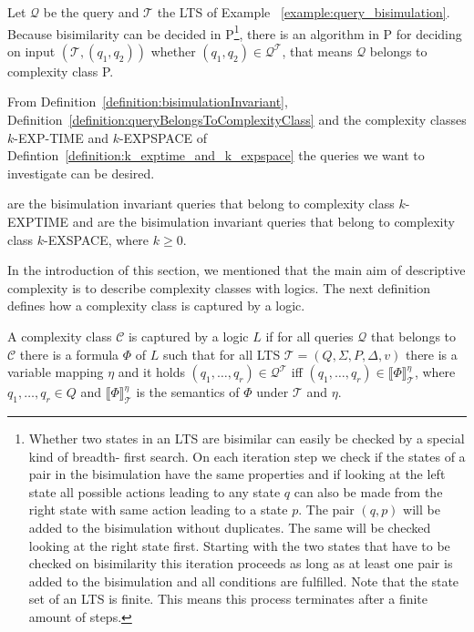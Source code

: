 \begin{example}{\cite{lange2014capturing}}
    Let $\mathcal{Q}$ be the query and $\mathcal{T}$ the LTS of Example~
    \ref{example:query_bisimulation}. Because bisimilarity can be decided in P\footnote{Whether two states in an LTS are bisimilar can easily be checked by a special kind of breadth-
    first search. On each iteration step we check if the states of a pair in the bisimulation have 
    the same properties and if looking at the left state all possible actions leading to any state $q
    $ can also be made from the right state with same action leading to a state $p$. The pair $
    (q, p)$ will be added to the bisimulation without duplicates. The same will be checked looking 
    at the right state first. Starting with the two states that have to be checked on bisimilarity this 
    iteration proceeds as long as at least one pair is added to the bisimulation and all conditions are fulfilled. Note that the state set of an LTS is finite. This means this process terminates after a finite amount of steps.}, 
    there is an 
    algorithm in P for deciding on input $(\mathcal{T}, (q_1, q_2))$ whether $(q_1, q_2) \in 
    \mathcal{Q}^\mathcal{T}$, that means $\mathcal{Q}$ belongs to 
    complexity class P.
\end{example}

From Definition~\ref{definition:bisimulationInvariant}, Definition~\ref{definition:queryBelongsToComplexityClass}
and the complexity classes $k$-EXP-TIME and $k$-EXPSPACE of Defintion~\ref{definition:k_exptime_and_k_expspace}
the queries we want to investigate can be desired.

\begin{definition}
    \label{definition:kExptimekExpspace}
     are the bisimulation invariant queries that belong to complexity class $k$-EXPTIME and
     are the bisimulation invariant queries that belong to complexity class $k$-EXSPACE, where $k \geq 0$.
\end{definition}

In the introduction of this section, we mentioned that the main aim of descriptive complexity is to describe complexity classes with logics. The next definition defines how a complexity class is captured by a logic. 

\begin{definition}
A complexity class $\mathcal{C}$ is captured by a logic $L$ if for all queries $\mathcal{Q}$ that belongs to $\mathcal{C}$ there is a formula $\Phi$ of $L$ such that for all LTS $\mathcal{T} = (Q, \Sigma, P, \Delta, v)$ there is a variable mapping $\eta$ and it holds $(q_1, \dots, q_{r}) \in \mathcal{Q}^\mathcal{T}$ iff $(q_1, \dots, q_{r}) \in \llbracket \Phi \rrbracket^\eta_\mathcal{T}$, where $q_1, \dots, q_r \in Q$ and $\llbracket \Phi \rrbracket^\eta_\mathcal{T}$ is the semantics of $\Phi$ under $\mathcal{T}$ and $\eta$.
\end{definition}

